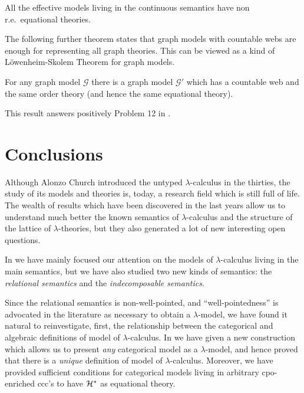 \documentclass[english]{llncs}
\newcommand{\lm}[1]{\mathscr{#1}} \newcommand{\Lint}[1]{\Lbrack #1\Rbrack} \newcommand{\ca}[1]{\mathscr{#1}} \newcommand{\Int}[1]{\vert #1\vert}
\newcommand{\cH}{{\cal H}}
\begin{document}
\begin{conjecture}
All the effective models living in the continuous semantics have non r.e.\ equational theories.
\end{conjecture}



The following further theorem states that graph models with countable webs are enough for representing all graph theories.
This can be viewed as a kind of L\"{o}wenheim-Skolem Theorem for graph models.

\begin{theorem}\label{LSKgen} \cite[Thm.~5.3.2]{ManzonettoTh} For any graph model $\lm{G}$ there is a graph model $\lm{G'}$ which has a countable web and the same order theory 
(and hence the same equational theory).
\end{theorem}

This result answers positively Problem 12 in \cite{Berline06}.



\section*{Conclusions}

Although Alonzo Church introduced the untyped $\lambda$-calculus in the thirties, the study of its models and theories is, today, 
a research field which is still full of life.
The wealth of results which have been discovered in the last years allow us to understand much better the known semantics of $\lambda$-calculus 
and the structure of the lattice of $\lambda$-theories, but they also generated a lot of new interesting open questions.

In \cite{ManzonettoTh} we have mainly focused our attention on the models of $\lambda$-calculus living in the main semantics, 
but we have also studied two new kinds of semantics: the {\em relational semantics} and the {\em indecomposable semantics}.

Since the relational semantics is non-well-pointed, and ``well-pointedness'' is advocated in the literature as necessary
to obtain a $\lambda$-model, we have found it natural to reinvestigate, first, the relationship between the categorical and algebraic definitions of 
model of $\lambda$-calculus. 
In \cite[Chapter~2]{ManzonettoTh} we have given a new construction which allows us to present {\em any} categorical model 
as a $\lambda$-model, and hence proved that there is a {\em unique} definition of model of $\lambda$-calculus. 
Moreover, we have provided sufficient conditions for categorical models living in arbitrary cpo-enriched ccc's to have $\cH^*$
as equational theory.
\end{document}

